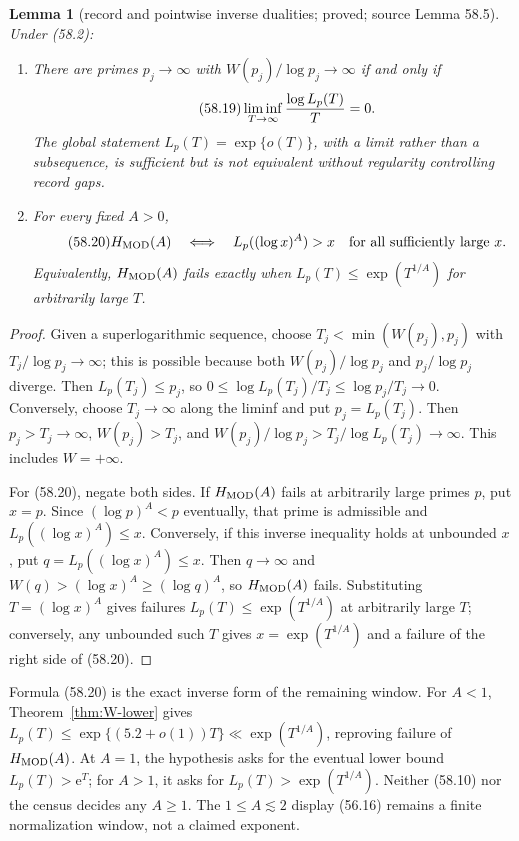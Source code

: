 \documentclass[10pt,reqno]{amsart}
\newtheorem{lemma}[theorem]{Lemma}
\theoremstyle{definition}
\newcommand{\e}{\mathrm e}
\newcommand{\1}{\mathbf 1}
\begin{document}
\begin{lemma}[record and pointwise inverse dualities; proved; source Lemma
58.5]\label{lem:inverse-dualities}
Under (58.2):
\begin{enumerate}[leftmargin=*,label=\arabic*.]
\item There are primes $p_j\to\infty$ with
$W(p_j)/\log p_j\to\infty$ if and only if
\begin{equation}\tag{58.19}
             \liminf_{T\to\infty}{\log L_p(T)\over T}=0.
\end{equation}
The global statement $L_p(T)=\exp\{o(T)\}$, with a limit rather than a
subsequence, is sufficient but is not equivalent without regularity
controlling record gaps.
\item For every fixed $A>0$,
\begin{equation}\tag{58.20}
 H_{\rm MOD}(A)\quad\Longleftrightarrow\quad
 L_p((\log x)^A)>x\quad\text{for all sufficiently large }x.
\end{equation}
Equivalently, $H_{\rm MOD}(A)$ fails exactly when
$L_p(T)\leq\exp(T^{1/A})$ for arbitrarily large $T$.
\end{enumerate}
\end{lemma}
\begin{proof}
Given a superlogarithmic sequence, choose
$T_j<\min(W(p_j),p_j)$ with $T_j/\log p_j\to\infty$; this is possible
because both $W(p_j)/\log p_j$ and $p_j/\log p_j$ diverge.  Then
$L_p(T_j)\leq p_j$, so
$0\leq\log L_p(T_j)/T_j\leq\log p_j/T_j\to0$.  Conversely, choose
$T_j\to\infty$ along the liminf and put $p_j=L_p(T_j)$.  Then
$p_j>T_j\to\infty$, $W(p_j)>T_j$, and
$W(p_j)/\log p_j>T_j/\log L_p(T_j)\to\infty$.  This includes
$W=+\infty$.

For (58.20), negate both sides.  If $H_{\rm MOD}(A)$ fails at arbitrarily
large primes $p$, put $x=p$.  Since $(\log p)^A<p$ eventually, that prime is
admissible and $L_p((\log x)^A)\leq x$.  Conversely, if this inverse
inequality holds at unbounded $x$, put
$q=L_p((\log x)^A)\leq x$.  Then $q\to\infty$ and
$W(q)>(\log x)^A\geq(\log q)^A$, so $H_{\rm MOD}(A)$ fails.  Substituting
$T=(\log x)^A$ gives failures
$L_p(T)\leq\exp(T^{1/A})$ at arbitrarily large $T$; conversely, any
unbounded such $T$ gives $x=\exp(T^{1/A})$ and a failure of the right side
of (58.20).
\end{proof}

Formula (58.20) is the exact inverse form of the remaining window.  For
$A<1$, Theorem~\ref{thm:W-lower} gives
$L_p(T)\leq\exp\{(5.2+o(1))T\}\ll\exp(T^{1/A})$, reproving failure of
$H_{\rm MOD}(A)$.  At $A=1$, the hypothesis asks for the eventual lower
bound $L_p(T)>\e^T$; for $A>1$, it asks for
$L_p(T)>\exp(T^{1/A})$.  Neither (58.10) nor the census decides any
$A\geq1$.  The $1\leq A\lesssim2$ display (56.16) remains a finite
normalization window, not a claimed exponent.
\end{document}
